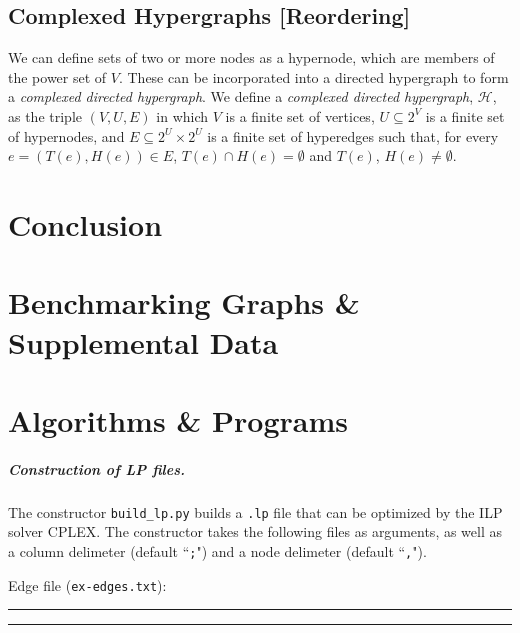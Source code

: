\documentclass[12pt,twoside]{reedthesis}
\newcommand{\new}[2]{{\color{red}#1 [#2]}}
\theoremstyle{definition}
\begin{document}
 \section{\new{Complexed Hypergraphs}{Reordering}}

 \new{
 We can define sets of two or more nodes as a hypernode, which are members of the power set of $V$.  These can be incorporated into a directed hypergraph to form a \textit{complexed directed hypergraph}.  We define a \textit{complexed directed hypergraph}, $\mathcal{H}$, as the triple $(V,U,E)$ in which $V$ is a finite set of vertices, $U \subseteq 2^V$ is a finite set of hypernodes, and $E \subseteq 2^U \times 2^U$ is a finite set of hyperedges such that, for every $e=(T(e),H(e)) \in E$, $T(e) \cap H(e) = \emptyset$ and $T(e)$, $H(e) \neq \emptyset$.\par}{Reordering}

\chapter*{Conclusion}
	\setcounter{chapter}{4}
	\setcounter{section}{0}


    \appendix
      \chapter{Benchmarking Graphs \& Supplemental Data}

      \chapter{Algorithms \& Programs}

        \paragraph{Construction of LP files.}The constructor \verb|build_lp.py| builds a \texttt{.lp} file that can be optimized by the ILP solver CPLEX. The constructor takes the following files as arguments, as well as a column delimeter (default ``\texttt{;}") and a node delimeter (default ``\texttt{,}").

        Edge file (\texttt{ex-edges.txt}):\\
        \rule{\textwidth}{1pt}
        
        \rule{\textwidth}{1pt}
\end{document}
